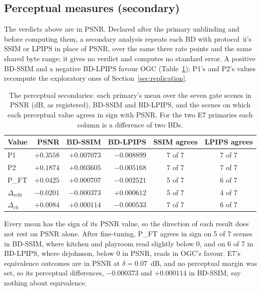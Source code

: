 \subsection{Perceptual measures (secondary)}
\label{sec:perceptual}

The verdicts above are in PSNR. %
Declared after the primary unblinding and before computing them, a secondary analysis repeats each BD with protocol~ii's SSIM or LPIPS in place of PSNR, over the same three rate points and the same shared byte range; it gives no verdict and computes no standard error. %
A positive BD-SSIM and a negative BD-LPIPS favour OGC (Table~\ref{tab:t6}); P1's and P2's values recompute the exploratory ones of Section~\ref{sec:replication}. %

\begin{table}[t]
\centering
\small
\caption{The perceptual secondaries: each primary's mean over the seven gate scenes in PSNR (dB, as registered), BD-SSIM and BD-LPIPS, and the scenes on which each perceptual value agrees in sign with PSNR. For the two E7 primaries each column is a difference of two BDs.}
\label{tab:t6}
\begin{tabular}{lrrrcc}
\hline
Value & PSNR & BD-SSIM & BD-LPIPS & SSIM agrees & LPIPS agrees \\
\hline
P1 & $+0.3558$ & $+0.007073$ & $-0.008899$ & 7 of 7 & 7 of 7 \\ %
P2 & $+0.1874$ & $+0.003605$ & $-0.005168$ & 7 of 7 & 7 of 7 \\ %
P\_FT & $+0.0425$ & $+0.000707$ & $-0.002521$ & 5 of 7 & 6 of 7 \\ %
$\Delta_{\mathrm{refit}}$ & $-0.0201$ & $-0.000373$ & $+0.000612$ & 5 of 7 & 4 of 7 \\ %
$\Delta_{\mathrm{cb}}$ & $+0.0084$ & $+0.000114$ & $-0.000533$ & 7 of 7 & 6 of 7 \\ %
\hline
\end{tabular}
\end{table}

Every mean has the sign of its PSNR value, so the direction of each result does not rest on PSNR alone. %
After fine-tuning, P\_FT agrees in sign on 5 of 7 scenes in BD-SSIM, where kitchen and playroom read slightly below 0, and on 6 of 7 in BD-LPIPS, where drjohnson, below 0 in PSNR, reads in OGC's favour. %
E7's equivalence outcomes are in PSNR at $\delta = 0.07$~dB, and no perceptual margin was set, so its perceptual differences, $-0.000373$ and $+0.000114$ in BD-SSIM, say nothing about equivalence. %
